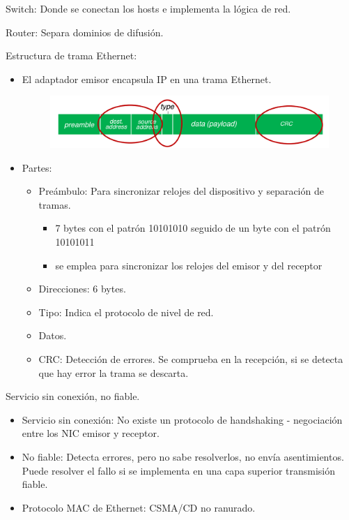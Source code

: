 \documentclass[12pt, twoside, openright]{report} %
\begin{document}
Switch: Donde se conectan los hosts e implementa la lógica de red.

Router: Separa dominios de difusión.

Estructura de trama Ethernet:
\begin{itemize}
	\item El adaptador emisor encapsula IP en una trama Ethernet.
	      \begin{figure}[H]
		      {\includegraphics[scale=.25]{Untitled 58.png}}
	      \end{figure}
	      \pagebreak
	\item Partes:
	      \begin{itemize}
		      \item Preámbulo: Para sincronizar relojes del dispositivo y separación de tramas.
		            \begin{itemize}
			            \item 7 bytes con el patrón 10101010 seguido de un byte con el patrón 10101011
			            \item se emplea para sincronizar los relojes del emisor y del receptor
		            \end{itemize}

		      \item Direcciones: 6 bytes.
		      \item Tipo: Indica el protocolo de nivel de red.
		      \item Datos.
		      \item CRC: Detección de errores. Se comprueba en la recepción, si se detecta que hay error la trama se descarta.
	      \end{itemize}

\end{itemize}


Servicio sin conexión, no fiable.

\begin{itemize}
	\item Servicio sin conexión: No existe un protocolo de handshaking -
	      negociación entre los NIC emisor y receptor.
	\item No fiable: Detecta errores, pero no sabe resolverlos, no envía
	      asentimientos. Puede resolver el fallo si se implementa en una
	      capa superior transmisión fiable.
	\item Protocolo MAC de Ethernet: CSMA/CD no ranurado.
\end{itemize}
\end{document}
